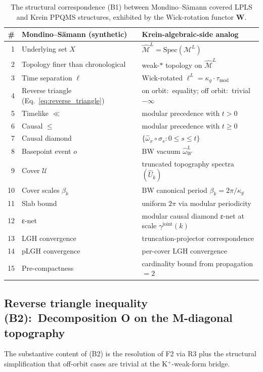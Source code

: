 \documentclass[11pt,a4paper]{article}
\theoremstyle{plain}
\theoremstyle{definition}
\newcommand{\Mcal}{\mathcal{M}}
\newcommand{\Ucal}{\mathcal{U}}
\newcommand{\gammajoint}{\gamma^{\mathrm{joint}}}
\newcommand{\Wfun}{\mathbf{W}}
\newcommand{\tmod}{\tau_{\mathrm{mod}}}
\newcommand{\kappag}{\kappa_{g}}
\begin{document}
\begin{table}[h]
\centering
\caption{The structural correspondence (B1) between Mondino--S\"amann
covered LPLS and Krein PPQMS structures, exhibited by the
Wick-rotation functor $\Wfun$.}
\label{tab:bridge_correspondence}
\begin{tabular}{rll}
\toprule
\# & Mondino--S\"amann (synthetic) & Krein-algebraic-side analog \\
\midrule
1 & Underlying set $X$ & $\hat{\Mcal}^{L} = \mathrm{Spec}(\Mcal^{L})$ \\
2 & Topology finer than chronological & weak-$*$ topology on $\hat{\Mcal}^{L}$ \\
3 & Time separation $\ell$ & Wick-rotated $\ell^{L} = \kappag\cdot\tmod$ \\
4 & Reverse triangle (Eq.~\eqref{eq:reverse_triangle}) & on orbit:\ equality; off orbit:\ trivial $-\infty$ \\
5 & Timelike $\ll$ & modular precedence with $t > 0$ \\
6 & Causal $\le$ & modular precedence with $t \ge 0$ \\
7 & Causal diamond & $\{\hat{\omega}_{x}\circ\sigma_{s} : 0 \le s \le t\}$ \\
8 & Basepoint event $o$ & BW vacuum $\hat{\omega}_{W}^{L}$ \\
9 & Cover $\Ucal$ & truncated topography spectra $(\hat{U}_{k})$ \\
10 & Cover scales $\beta_{k}$ & BW canonical period $\beta_{k} = 2\pi/\kappag$ \\
11 & Slab bound & uniform $2\pi$ via modular periodicity \\
12 & ε-net & modular causal diamond ε-net at scale $\gammajoint(k)$ \\
13 & LGH convergence & truncation-projector correspondence \\
14 & pLGH convergence & per-cover LGH convergence \\
15 & Pre-compactness & cardinality bound from propagation $= 2$ \\
\bottomrule
\end{tabular}
\end{table}

\subsection{Reverse triangle inequality (B2):\ Decomposition O on the
M-diagonal topography}\label{sec:b2_decomposition_o}

The substantive content of (B2) is the resolution of F2 via R3 plus
the structural simplification that off-orbit cases are trivial at the
K$^{+}$-weak-form bridge.
\end{document}
